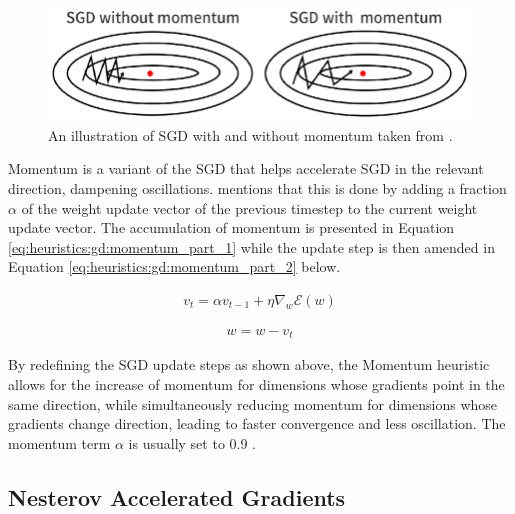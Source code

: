 \begin{figure}[htbp]
      \includegraphics[width=\textwidth]{images/sgd_with_and_without_momentum.png}
      \caption{An illustration of \ac{SGD} with and without momentum taken from \cite{ref:du:2019}.}
      \label{fig:heuristics:gd:sgd_with_and_without_momentum}
\end{figure}

Momentum \cite{ref:qian:1999} is a variant of the \ac{SGD} that helps accelerate \ac{SGD} in the relevant direction, dampening oscillations. \cite{ref:ruder:2016} mentions that this is done by adding a fraction $\alpha$ of the weight update vector of the previous timestep to the current weight update vector. The accumulation of momentum is presented in Equation \ref{eq:heuristics:gd:momentum_part_1} while the update step is then amended in Equation \ref{eq:heuristics:gd:momentum_part_2} below.

\begin{equation}
      \label{eq:heuristics:gd:momentum_part_1}
      \begin{split}
            v_{t} = \alpha v_{t-1} + \eta \nabla_{w}\mathcal{E}(w)
      \end{split}
\end{equation}

\begin{equation}
      \label{eq:heuristics:gd:momentum_part_2}
      \begin{split}
            w = w - v_{t}
      \end{split}
\end{equation}

By redefining the \ac{SGD} update steps as shown above, the \ac{Momentum} heuristic allows for the increase of momentum for dimensions whose gradients point in the same direction, while simultaneously reducing momentum for dimensions whose gradients change direction, leading to faster convergence and less oscillation. The momentum term $\alpha$ is usually set to 0.9 \cite{ref:engelbrecht:2007}\cite{ref:ruder:2016}.


\subsection{Nesterov Accelerated Gradients}
\label{sec:heuristics:nag}

